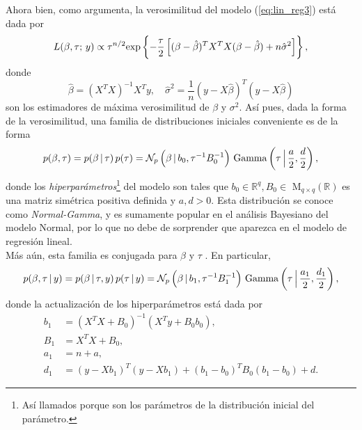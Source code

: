 Ahora bien, como \citet{notas_lm_egp} argumenta, la verosimilitud del modelo (\ref{eq:lin_reg3}) está dada por
\begin{equation*}
	L(\beta, \tau; \, y) \propto \tau^{n/2} \mathrm{exp} \left\{ -\frac{\tau}{2} \left[ (\beta - \hat{\beta})^T X^T X (\beta - \hat{\beta}) + n \hat{\sigma}^2 \right] \right\},
\end{equation*}
donde
\begin{equation*}
	\hat{\beta} = (X^T X)^{-1} X^T y, \quad \hat{\sigma}^2 = \frac{1}{n} (y - X\hat{\beta})^T (y - X\hat{\beta})
\end{equation*}
son los estimadores de máxima verosimilitud de $\beta$ y $\sigma^2$. Así pues, dada la forma de la verosimilitud, una familia de distribuciones iniciales conveniente es de la forma
\begin{equation} \label{eq:lin_reg_conjugated}
	p(\beta, \tau) = p(\beta \, | \, \tau) \, p(\tau) = \mathcal{N}_p \left(\beta \, | \, b_0, \tau^{-1} B_{0}^{-1} \right) \, \mathrm{Gamma} \left(\tau \, \Big| \, \frac{a}{2}, \frac{d}{2} \right),
\end{equation}
donde los \textit{hiperparámetros}\footnote{Así llamados porque son los parámetros de la distribución inicial del parámetro.} del modelo son tales que $b_0 \in \mathbb{R}^q, B_0 \in$ M$_{q \times q} (\mathbb{R})$ es una matriz simétrica positiva definida y $a, d > 0$. Esta distribución se conoce como \textit{Normal-Gamma}, y es sumamente popular en el análisis Bayesiano del modelo Normal, por lo que no debe de sorprender que aparezca en el modelo de regresión lineal. \\

Más aún, esta familia es conjugada para $\beta$ y $\tau$ \cite[Capítulo~3.3]{notas_lm_egp}. En particular,
\begin{equation*}
	p( \beta, \tau \, | \, y) = p(\beta \, | \, \tau, y) \, p(\tau \, | \, y) = \mathcal{N}_p \left(\beta \, | \, b_1, \tau^{-1} B_{1}^{-1} \right) \, \mathrm{Gamma} \left(\tau \, \Big| \, \frac{a_1}{2}, \frac{d_1}{2} \right),
\end{equation*}
donde la actualización de los hiperparámetros está dada por
\begin{align*}
	b_1 &= (X^T X + B_0)^{-1} (X^T y + B_0 b_0), \\
    B_1 &= X^T X + B_0, \\
    a_1 &= n + a, \\
    d_1 &= (y - X b_1)^T (y - X b_1) + (b_1 - b_0)^T B_0 (b_1 - b_0) + d.
\end{align*}


